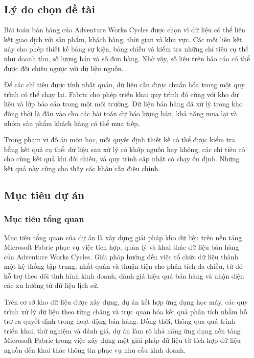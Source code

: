 \subsection{Lý do chọn đề tài}

Bài toán bán hàng của Adventure Works Cycles được chọn vì dữ liệu có thể liên kết giao dịch với sản phẩm, khách hàng, thời gian và khu vực. Các mối liên kết này cho phép thiết kế bảng sự kiện, bảng chiều và kiểm tra những chỉ tiêu cụ thể như doanh thu, số lượng bán và số đơn hàng. Nhờ vậy, số liệu trên báo cáo có thể được đối chiếu ngược với dữ liệu nguồn.

Để các chỉ tiêu được tính nhất quán, dữ liệu cần được chuẩn hóa trong một quy trình có thể chạy lại. Fabric cho phép triển khai quy trình đó cùng với kho dữ liệu và lớp báo cáo trong một môi trường. Dữ liệu bán hàng đã xử lý trong kho đồng thời là đầu vào cho các bài toán dự báo lượng bán, khả năng mua lại và nhóm sản phẩm khách hàng có thể mua tiếp.

Trong phạm vi đồ án môn học, mỗi quyết định thiết kế có thể được kiểm tra bằng kết quả cụ thể: dữ liệu sau xử lý có khớp nguồn hay không, các chỉ tiêu có cho cùng kết quả khi đối chiếu, và quy trình cập nhật có chạy ổn định. Những kết quả này cũng cho thấy các khâu cần điều chỉnh.

\subsection{Mục tiêu dự án}

\subsubsection{Mục tiêu tổng quan}

Mục tiêu tổng quan của dự án là xây dựng giải pháp kho dữ liệu trên nền tảng Microsoft Fabric phục vụ việc tích hợp, quản lý và khai thác dữ liệu bán hàng của Adventure Works Cycles. Giải pháp hướng đến việc tổ chức dữ liệu thành một hệ thống tập trung, nhất quán và thuận tiện cho phân tích đa chiều, từ đó hỗ trợ theo dõi tình hình kinh doanh, đánh giá hiệu quả bán hàng và nhận diện các xu hướng từ dữ liệu lịch sử.

Trên cơ sở kho dữ liệu được xây dựng, dự án kết hợp ứng dụng học máy, các quy trình xử lý dữ liệu theo từng chặng và trực quan hóa kết quả phân tích nhằm hỗ trợ ra quyết định trong hoạt động bán hàng. Đồng thời, thông qua quá trình triển khai, thử nghiệm và đánh giá, dự án làm rõ khả năng ứng dụng nền tảng Microsoft Fabric trong việc xây dựng một giải pháp dữ liệu từ tích hợp dữ liệu nguồn đến khai thác thông tin phục vụ nhu cầu kinh doanh.

